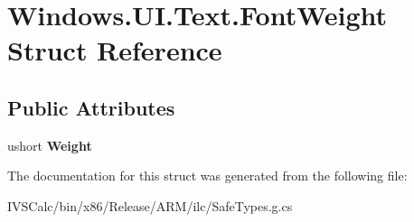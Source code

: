 \hypertarget{struct_windows_1_1_u_i_1_1_text_1_1_font_weight}{}\section{Windows.\+U\+I.\+Text.\+Font\+Weight Struct Reference}
\label{struct_windows_1_1_u_i_1_1_text_1_1_font_weight}
\subsection*{Public Attributes}
\begin{DoxyCompactItemize}
\item 
\mbox{\label{struct_windows_1_1_u_i_1_1_text_1_1_font_weight_a4659183ae9dc1b3de7986da33b7b8840}} 
ushort {\bfseries Weight}
\end{DoxyCompactItemize}


The documentation for this struct was generated from the following file\+:\begin{DoxyCompactItemize}
\item 
I\+V\+S\+Calc/bin/x86/\+Release/\+A\+R\+M/ilc/Safe\+Types.\+g.\+cs\end{DoxyCompactItemize}
